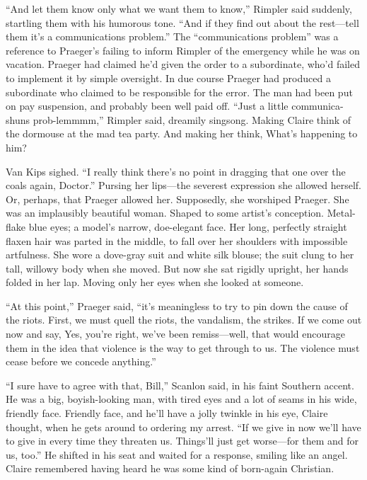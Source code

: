 ``And let them know only what we want them to know,'' Rimpler said suddenly, startling them with his humorous tone. ``And if they find out about the rest---tell them it's a communications problem.'' The ``communications problem'' was a reference to Praeger's failing to inform Rimpler of the emergency while he was on vacation. Praeger had claimed he'd given the order to a subordinate, who'd failed to implement it by simple oversight. In due course Praeger had produced a subordinate who claimed to be responsible for the error. The man had been put on pay suspension, and probably been well paid off. ``Just a little communica-shuns prob-lemmmm,'' Rimpler said, dreamily singsong. Making Claire think of the dormouse at the mad tea party. And making her think, What's happening to him?

Van Kips sighed. ``I really think there's no point in dragging that one over the coals again, Doctor.'' Pursing her lips---the severest expression she allowed herself. Or, perhaps, that Praeger allowed her. Supposedly, she worshiped Praeger. She was an implausibly beautiful woman. Shaped to some artist's conception. Metal-flake blue eyes; a model's narrow, doe-elegant face. Her long, perfectly straight flaxen hair was parted in the middle, to fall over her shoulders with impossible artfulness. She wore a dove-gray suit and white silk blouse; the suit clung to her tall, willowy body when she moved. But now she sat rigidly upright, her hands folded in her lap. Moving only her eyes when she looked at someone.

``At this point,'' Praeger said, ``it's meaningless to try to pin down the cause of the riots. First, we must quell the riots, the vandalism, the strikes. If we come out now and say, Yes, you're right, we've been remiss---well, that would encourage them in the idea that violence is the way to get through to us. The violence must cease before we concede anything.''

``I sure have to agree with that, Bill,'' Scanlon said, in his faint Southern accent. He was a big, boyish-looking man, with tired eyes and a lot of seams in his wide, friendly face. Friendly face, and he'll have a jolly twinkle in his eye, Claire thought, when he gets around to ordering my arrest. ``If we give in now we'll have to give in every time they threaten us. Things'll just get worse---for them and for us, too.'' He shifted in his seat and waited for a response, smiling like an angel. Claire remembered having heard he was some kind of born-again Christian.

